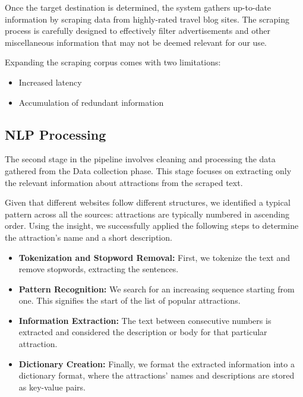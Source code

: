 \documentclass[final,3p,times,authoryear]{elsarticle}
\begin{document}
        Once the target destination is determined, the system gathers up-to-date information by scraping data from highly-rated travel blog sites. The scraping process is carefully designed to effectively filter advertisements and other miscellaneous information that may not be deemed relevant for our use.
        
        Expanding the scraping corpus comes with two limitations:
        \begin{itemize}
            \item Increased latency
            \item Accumulation of redundant information
        \end{itemize}
    
    \vspace{-7pt}
    
    \subsection{NLP Processing}
        The second stage in the pipeline involves cleaning and processing the data gathered from the Data collection phase. This stage focuses on extracting only the relevant information about attractions from the scraped text.
        
        Given that different websites follow different structures, we identified a typical pattern across all the sources: attractions are typically numbered in ascending order. Using the insight, we successfully applied the following steps to determine the attraction's name and a short description.
        
        \begin{itemize}
            \item \textbf{Tokenization and Stopword Removal:} First, we tokenize the text and remove stopwords, extracting the sentences.
            
            \item \textbf{Pattern Recognition:} We search for an increasing sequence starting from one. This signifies the start of the list of popular attractions.
            
            \item \textbf{Information Extraction:} The text between consecutive numbers is extracted and considered the description or body for that particular attraction.
            
            \item \textbf{Dictionary Creation:} Finally, we format the extracted information into a dictionary format, where the attractions' names and descriptions are stored as key-value pairs.
        \end{itemize}
        
\end{document}
